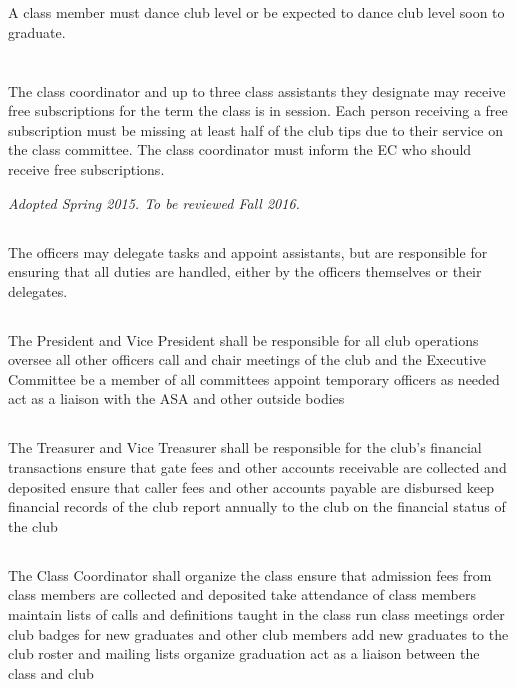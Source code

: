 \documentclass{bylaws}
\newcommand{\sptimes}[2]{\emph{Adopted #1. To be reviewed #2.}}
\begin{document}
\section{}A class member must dance club level or be expected to dance club level soon to graduate.
\section{}The class coordinator and up to three class assistants they designate may receive free subscriptions for the term the class is in session. Each person receiving a free subscription must be missing at least half of the club tips due to their service on the class committee. The class coordinator must inform the EC who should receive free subscriptions.


\sptimes{Spring 2015}{Fall 2016}


\subsection{}The officers may delegate tasks and appoint assistants, but are responsible for ensuring that all duties are handled, either by the officers themselves or their delegates.

\subsection{}The President and Vice President shall
\duty be responsible for all club operations
\duty oversee all other officers
\duty call and chair meetings of the club and the Executive Committee
\duty be a member of all committees
\duty appoint temporary officers as needed
\duty act as a liaison with the ASA and other outside bodies

\subsection{}The Treasurer and Vice Treasurer shall
\duty be responsible for the club's financial transactions
\duty ensure that gate fees and other accounts receivable are collected and deposited
\duty ensure that caller fees and other accounts payable are disbursed
\duty keep financial records of the club
\duty report annually to the club on the financial status of the club

\subsection{}The Class Coordinator shall
\duty organize the class
\duty ensure that admission fees from class members are collected and deposited
\duty take attendance of class members
\duty maintain lists of calls and definitions taught in the class
\duty run class meetings
\duty order club badges for new graduates and other club members
\duty add new graduates to the club roster and mailing lists
\duty organize graduation
\duty act as a liaison between the class and club
\end{document}
